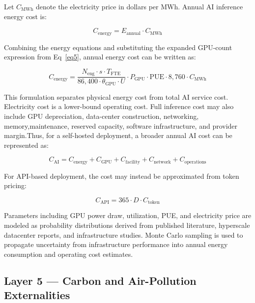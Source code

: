 \documentclass{article}
\begin{document}
Let $C_{\mathrm{MWh}}$ denote the electricity price in dollars per MWh. Annual AI inference energy cost is:

\begin{equation}
C_{\mathrm{energy}} = E_{\mathrm{annual}} \cdot C_{\mathrm{MWh}} 
\label{eq8}
\end{equation}

Combining the energy equations and substituting the expanded GPU-count expression from Eq~\ref{eq5}, annual energy cost can be written as:

\begin{equation}
C_{\mathrm{energy}} = \frac{N_{\mathrm{eng}} \cdot s \cdot T_{\mathrm{FTE}}} {86{,}400 \cdot \theta_{\mathrm{GPU}} \cdot U} \cdot P_{\mathrm{GPU}} \cdot \mathrm{PUE}\cdot 8{,}760 \cdot C_{\mathrm{MWh}}
\label{eq9}
\end{equation}

This formulation separates physical energy cost from total AI service cost. Electricity cost is a lower-bound operating cost. Full inference cost may also include GPU depreciation, data-center construction, networking, memory,maintenance, reserved capacity, software infrastructure, and provider margin.Thus, for a self-hosted deployment, a broader annual AI cost can be represented as:

\begin{equation}
C_{\mathrm{AI}} = C_{\mathrm{energy}} + C_{\mathrm{GPU}}+ C_{\mathrm{facility}}+ C_{\mathrm{network}}+ C_{\mathrm{operations}}
\label{eq10}
\end{equation}

For API-based deployment, the cost may instead be approximated from token pricing:

\begin{equation}
C_{\mathrm{API}} = 365 \cdot D \cdot C_{\mathrm{token}}
\label{eq11}
\end{equation}

Parameters including GPU power draw, utilization, PUE, and electricity price are modeled as probability distributions derived from published literature, hyperscale datacenter reports, and infrastructure studies. Monte Carlo sampling is used to propagate uncertainty from infrastructure performance into annual energy consumption and operating cost estimates.

\subsection{Layer 5 --- Carbon and Air-Pollution Externalities}
\end{document}
